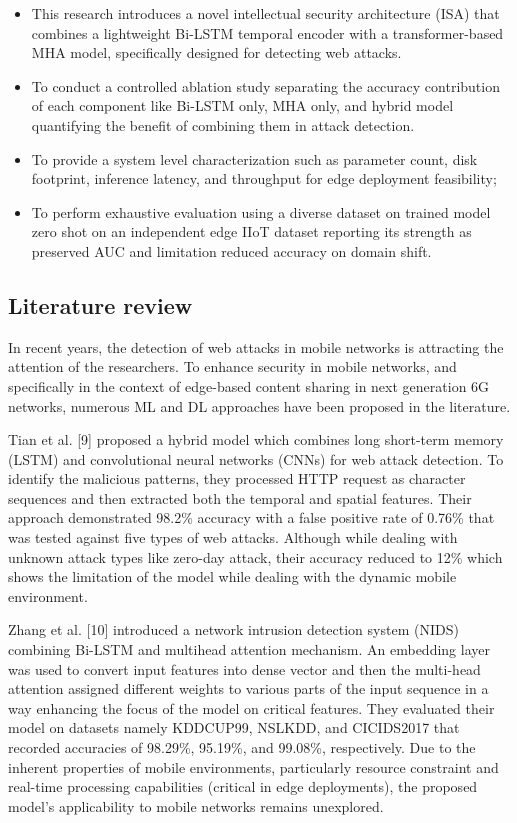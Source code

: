 \begin{itemize}
  \item This research introduces a novel intellectual security architecture (ISA) that combines a
        lightweight Bi-LSTM temporal encoder with a transformer-based MHA model, specifically
        designed for detecting web attacks.
  \item To conduct a controlled ablation study separating the accuracy contribution of each
        component like Bi-LSTM only, MHA only, and hybrid model quantifying the benefit of
        combining them in attack detection.
  \item To provide a system level characterization such as parameter count, disk footprint,
        inference latency, and throughput for edge deployment feasibility;
  \item To perform exhaustive evaluation using a diverse dataset on trained model zero shot on an
        independent edge IIoT dataset reporting its strength as preserved AUC and limitation
        reduced accuracy on domain shift.
\end{itemize}

\subsection{Literature review}\label{sec:literature}

In recent years, the detection of web attacks in mobile networks is attracting the attention of
the researchers. To enhance security in mobile networks, and specifically in the context of
edge-based content sharing in next generation 6G networks, numerous ML and DL approaches have been
proposed in the literature.

Tian et al. [9] proposed a hybrid model which combines long short-term memory (LSTM) and
convolutional neural networks (CNNs) for web attack detection. To identify the malicious patterns,
they processed HTTP request as character sequences and then extracted both the temporal and spatial
features. Their approach demonstrated 98.2\% accuracy with a false positive rate of 0.76\% that was
tested against five types of web attacks. Although while dealing with unknown attack types like
zero-day attack, their accuracy reduced to 12\% which shows the limitation of the model while
dealing with the dynamic mobile environment.

Zhang et al. [10] introduced a network intrusion detection system (NIDS) combining Bi-LSTM and
multihead attention mechanism. An embedding layer was used to convert input features into dense
vector and then the multi-head attention assigned different weights to various parts of the input
sequence in a way enhancing the focus of the model on critical features. They evaluated their model
on datasets namely KDDCUP99, NSLKDD, and CICIDS2017 that recorded accuracies of 98.29\%, 95.19\%,
and 99.08\%, respectively. Due to the inherent properties of mobile environments, particularly
resource constraint and real-time processing capabilities (critical in edge deployments), the
proposed model's applicability to mobile networks remains unexplored.

